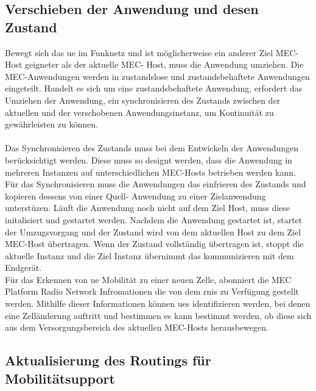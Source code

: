 \documentclass[runningheads]{llncs}
\numberwithin{figure}{section}
\begin{document}
\subsection{Verschieben der Anwendung und desen Zustand}
Bewegt sich das \acrshort{ue} im Funknetz und ist möglicherweise ein anderer Ziel MEC-Host geigneter als der aktuelle
MEC- Host, muss die Anwendung umziehen. Die MEC-Anwendungen werden in zustandslose und zustandsbehaftete Anwendungen eingeteilt.
Handelt es sich um eine zustandsbehaftete Anwendung, 
erfordert das Umziehen der Anwendung, ein synchronisieren des Zustands zwischen der aktuellen und der
verschobenen Anwendungsinstanz, um Kontinuität zu gewährleisten zu können.
\\
\\
Das Synchronisieren des Zustands muss bei dem Entwickeln der Anwendungen berücksichtigt werden. Diese muss so designt werden, 
dass die Anwendung in mehreren Instanzen auf unterschiedlichen MEC-Hosts betrieben werden kann. 
Für das Synchronisieren muss die Anwendungen das einfrieren des Zustands und kopieren dessens von einer Quell- Anwendung 
zu einer Zielanwendung unterstüzen. 
Läuft die Anwendung noch nicht auf dem Ziel Host, muss diese initalisiert und gestartet werden.
Nachdem die Anwendung gestartet ist, startet der Umzugsvorgang und der Zustand wird von dem aktuellen 
Host zu dem Ziel MEC-Host übertragen. Wenn der Zustand vollständig übertragen ist, stoppt die aktuelle Instanz
und die Ziel Instanz übernimmt das kommunizieren mit dem Endgerät.
\\
Für das Erkennen von \acrshort{ue} Mobilität zu einer neuen Zelle, abonniert die MEC Platform Radio Network Infromationen die von dem \acrfull{rnis} zu
Verfügung gestellt werden. Mithilfe dieser Informationen können \acrshort{ue}s identifizieren werden, bei denen eine Zelländerung auftritt 
und bestimmen es kann bestimmt werden, ob diese sich aus dem Versorgungsbereich des aktuellen MEC-Hosts herausbewegen.
\subsection{Aktualisierung des Routings für Mobilitätsupport}
\end{document}

